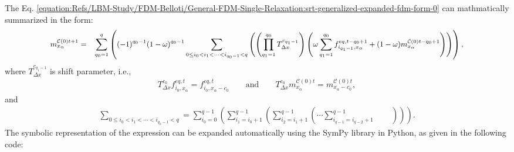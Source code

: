 \documentclass[letterpaper,10pt,english,openany,oneside]{jupyterBook}
\begin{document}
\sphinxAtStartPar
The Eq. \eqref{equation:Refs/LBM-Study/FDM-Belloti/General-FDM-Single-Relaxation:srt-generalized-expanded-fdm-form-0} can mathmatically summarized in the form:
\begin{equation}\label{equation:Refs/LBM-Study/FDM-Belloti/General-FDM-Single-Relaxation:srt-generalized-fdm-form-0}
\begin{split}
\small
\begin{array}{rl}
m_{x_{\alpha}}^{\mathcal{C}(0)t+1} = & \displaystyle \sum_{q_{0}=1}^{q}  \left( (-1)^{q_{0}-1}(1-\omega)^{q_{0}-1} \sum_{0\le i_0 <i_1 <\cdots <i_{q_{0}-1} <q}  \left( \left(\prod_{q_{1} = 1}^{q_{0}}T_{\Delta x}^{c_{q_{1}-1}} \right) \left(\omega \sum_{q_{1}=1}^{q_{0}} f_{i_{q_{1}-1},x_{\alpha}}^{eq,t-q_{0}+1} + (1-\omega)m_{x_{\alpha}}^{\mathcal{C}(0)t-q_{0}+1}\right) \right)\right),
\end{array}
\end{split}
\end{equation}
\sphinxAtStartPar
where \(T_{\Delta x}^{c_{q_{1}-1}}\) is shift parameter, i.e.,
\begin{equation*}
\begin{split}
T_{\Delta x}^{c_{0}} f_{i_{0},x_{\alpha}}^{eq,t} = f_{i_{0},x_{\alpha}-c_{0}}^{eq,t} \qquad \text{and} \qquad T_{\Delta x}^{c_{0}} m_{x_{\alpha}}^{\mathcal{C}(0)t} = m_{x_{\alpha}-c_{0}}^{\mathcal{C}(0)t},
\end{split}
\end{equation*}
\sphinxAtStartPar
and
\begin{equation}\label{equation:Refs/LBM-Study/FDM-Belloti/General-FDM-Single-Relaxation:compress-sum}
\begin{split}
\displaystyle\sum_{0\le i_0 <i_1 <\cdots <i_{q_{0}-1} <q} = \sum_{i_0=0}^{q-1} \left( \sum_{i_1=i_0+1}^{q-1} \left( \sum_{i_2=i_1+1}^{q-1} \left( \cdots \sum_{i_{q-1}=i_{q-2}+1}^{q-1} \qquad \right)\right)\right).
\end{split}
\end{equation}
\sphinxAtStartPar
The symbolic representation of the expression can be expanded automatically using the SymPy library in Python, as given in the following code:
\end{document}
